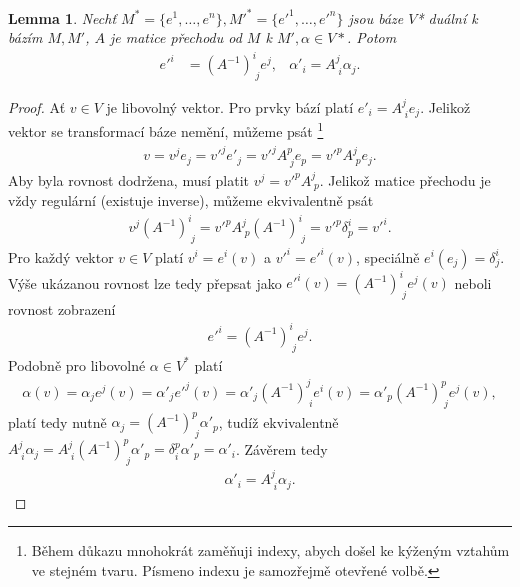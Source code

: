 \documentclass[a4paper,11pt]{article}
\theoremstyle{theorem}
\newtheorem{lemma}[theorem]{Lemma}
\theoremstyle{remark}
\theoremstyle{definition}
\begin{document}
	
	
	\begin{lemma}
		Nechť $M^* = \{e^1, \dots, e^n\}, M'^* = \{e'^1, \dots, e'^n\}$ jsou báze $V$* duální k bázím $M, M'$, $A$ je matice přechodu od $M$ k $M', \alpha \in V*$. Potom
		\begin{align}
			e'^i &= (A^{-1})^i_{\; j} e^j, & \alpha'_i = A^j_{\; i} \alpha_j.
		\end{align}
	\end{lemma}
	\begin{proof}
		Ať $v\in V$ je libovolný vektor. Pro prvky bází platí $e'_i = A^j_{\; i} e_j$. Jelikož vektor se transformací báze nemění, můžeme psát%
		\footnote{Během důkazu mnohokrát zaměňuji indexy, abych došel ke kýženým vztahům ve stejném tvaru. Písmeno indexu je samozřejmě otevřené volbě.}
		\begin{align*}
			v = v^j e_j = v'^j e'_j = v'^j A^p_{\; j} e_p = v'^p A^j_{\; p} e_j.
		\end{align*}
		Aby byla rovnost dodržena, musí platit $v^j = v'^p A^j_{\; p}$. Jelikož matice přechodu je vždy regulární (existuje inverse), můžeme ekvivalentně psát
		\begin{align*}
			v^j (A^{-1})^i_{\; j} = v'^p A^j_{\; p} (A^{-1})^i_{\; j} = v'^p \delta^i_p = v'^i.
		\end{align*}
		Pro každý vektor $v \in V$ platí $v^i = e^i(v)$ a $v'^i = e'^i(v)$, speciálně $e^i(e_j) = \delta^i_j$. Výše ukázanou rovnost lze tedy přepsat jako $e'^i(v) = (A^{-1})^i_{\; j} e^j(v)$ neboli rovnost zobrazení
		\begin{align*}
			e'^i = (A^{-1})^i_{\; j} e^j.
		\end{align*}
		Podobně pro libovolné $\alpha \in V^*$ platí
		\begin{align*}
			\alpha(v) = \alpha_j e^j(v) = \alpha'_j e'^j(v) = \alpha'_j (A^{-1})^j_{\; i} e^i(v) = \alpha'_p (A^{-1})^p_{\; j} e^j(v),
		\end{align*}
		platí tedy nutně $\alpha_j = (A^{-1})^p_{\; j} \alpha'_p$, tudíž ekvivalentně $A^j_{\; i} \alpha_j = A^j_{\; i} (A^{-1})^p_{\; j} \alpha'_p = \delta^p_i \alpha'_p = \alpha'_i$. Závěrem tedy
		\begin{align*}
			\alpha'_i = A^j_{\; i} \alpha_j.
		\end{align*}
	\end{proof}
	
\end{document}
